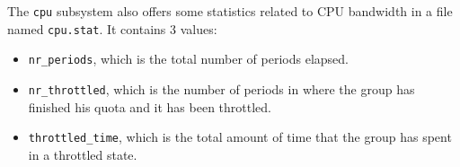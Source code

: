 The \verb|cpu| subsystem also offers some statistics related to CPU bandwidth in a file named \verb|cpu.stat|. It contains 3 values:
\begin{itemize}
    \item \verb|nr_periods|, which is the total number of periods elapsed.
    \item \verb|nr_throttled|, which is the number of periods in where the group has finished his quota and it has been throttled.
    \item \verb|throttled_time|, which is the total amount of time that the group has spent in a throttled state.
\end{itemize}





